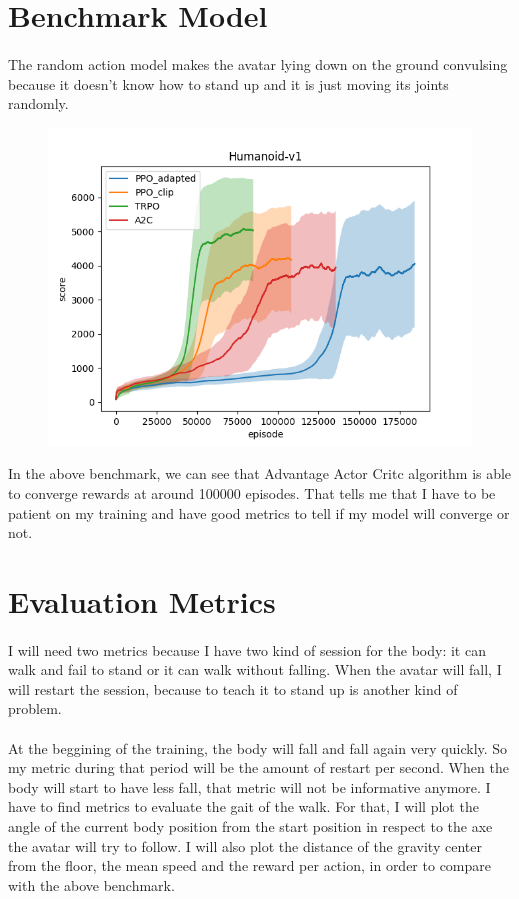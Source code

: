 \documentclass{article}
\begin{document}
	\section{Benchmark Model}
  \paragraph{}
  The random action model makes the avatar lying down on the ground convulsing
  because it doesn't know how to stand up and it is just moving its joints
  randomly.

  \begin{figure}[ht]
    \centering
    \includegraphics[width=.5\textwidth,height=.5\textheight,keepaspectratio]{Humanoid}
  \end{figure}

  In the above benchmark, we can see that Advantage Actor Critc algorithm is
  able to converge rewards at around 100000 episodes. That tells me that I have to be
  patient on my training and have good metrics to tell if my model will converge
  or not.
  
	\section{Evaluation Metrics}
  \paragraph{}
  I will need two metrics because I have two kind of session for the body: it can walk
  and fail to stand or it can walk without falling. When the avatar will fall, I
  will restart the session, because to teach it to stand up is another kind of
  problem.
  \paragraph{}
  At the beggining of the training, the body will fall and fall again very quickly.
  So my metric during that period will be the amount of restart per second. When the
  body will start to have less fall, that metric will not be informative anymore.
  I have to find metrics to evaluate the gait of the walk. For that, I will plot
  the angle of the current body position from the start position in respect to the
  axe the avatar will try to follow. I will also plot the distance of the gravity
  center from the floor, the mean speed and the reward per action, in order to
  compare with the above benchmark.
  
\end{document}
